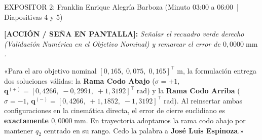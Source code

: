 \documentclass[11pt,a4paper]{article}
\newcommand{\accion}[1]{%
  \par\smallskip\noindent%
  {\color{uniGranate}\textbf{[ACCIÓN / SEÑA EN PANTALLA]:}} {\itshape\color{uniAzul!90!black} #1}\par\smallskip%
}
\newcommand{\speech}[1]{%
  \noindent{\color{verdeOk!85!black}\textbf{[SPEECH]:}} «#1»\par\medskip%
}
\begin{document}
\begin{cajaexpositor}[uniGranate]{EXPOSITOR 2: Franklin Enrique Alegría Barboza (Minuto 03:00 a 06:00 \,|\, Diapositivas 4 y 5)}
\accion{Señalar el recuadro verde derecho (\emph{Validación Numérica en el Objetivo Nominal}) y remarcar el error de $0{,}0000\;\text{mm}$.}
\speech{Para el aro objetivo nominal $[0{,}165,\; 0{,}075,\; 0{,}165]^\top\;\text{m}$, la formulación entrega dos soluciones válidas: la \textbf{Rama Codo Abajo} ($\sigma = +1$, $\bm{q}^{(+)} = [0{,}4266,\; -0{,}2991,\; +1{,}3192]^\top\;\text{rad}$) y la \textbf{Rama Codo Arriba} ($\sigma = -1$, $\bm{q}^{(-)} = [0{,}4266,\; +1{,}1852,\; -1{,}3192]^\top\;\text{rad}$). Al reinsertar ambas configuraciones en la cinemática directa, el error de cierre euclidiano es \textbf{exactamente $0{,}0000\;\text{mm}$}. En trayectoria adoptamos la rama codo abajo por mantener $q_2$ centrado en su rango. Cedo la palabra a \textbf{José Luis Espinoza}.}
\end{cajaexpositor}
\end{document}
